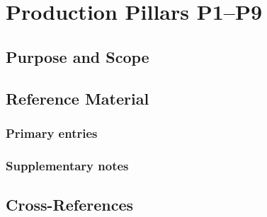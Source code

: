 \chapter{Production Pillars P1--P9}
\label{app:pillars}


\section{Purpose and Scope}
\label{sec:app_pillars:purpose}

\section{Reference Material}
\label{sec:app_pillars:reference}

\subsection{Primary entries}
\label{ssec:app_pillars:primary}

\subsection{Supplementary notes}
\label{ssec:app_pillars:supplementary}

\section{Cross-References}
\label{sec:app_pillars:xref}
